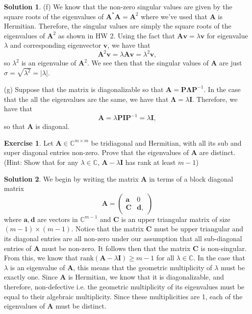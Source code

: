 \documentclass[12pt]{article}
\newcommand{\bbC}{\mathbb{C}}
\newcommand{\abs}[1]{ \left| #1 \right| }
\renewcommand{\vec}[1]{\mathbf{#1}}
\theoremstyle{definition}
\newtheorem{exer}{Exercise}
\newtheorem{sol}{Solution}
\theoremstyle{remark}
\begin{document}
\begin{sol}
(f) We know that the non-zero singular values are given by the square roots of the eigenvalues of $\vec{A}^* \vec{A} = \vec{A}^2$ where we've used that $\vec{A}$ is Hermitian. Therefore, the singular values are simply the square roots of the eigenvalues of $\vec{A}^2$ as shown in HW 2. Using the fact that $\vec{A} \vec{v} = \lambda \vec{v}$ for eigenvalue $\lambda$ and corresponding eigenvector $\vec{v}$, we have that 
\begin{equation}
    \vec{A}^2 \vec{v} = \lambda \vec{A} \vec{v} = \lambda^2 \vec{v},
\end{equation}
so $\lambda^2$ is an eigenvalue of $\vec{A}^2$. We see then that the singular values of $\vec{A}$ are just $\sigma = \sqrt{\lambda^2} = \abs{\lambda}$. 

(g) Suppose that the matrix is diagonalizable so that $\vec{A} = \vec{P} \vec{\Lambda} \vec{P}^{-1}$. In the case that the all the eigenvalues are the same, we have that $\vec{\Lambda} = \lambda \vec{I}$. Therefore, we have that 
\begin{equation*}
\vec{A} = \lambda \vec{P} \vec{I} \vec{P}^{-1} = \lambda \vec{I},
\end{equation*}
so that $\vec{A}$ is diagonal.

\end{sol}
\newpage

\begin{exer}
    Let $\vec{A}\in \bbC^{m\times m}$ be tridiagonal and Hermitian, with all its sub and super diagonal entries non-zero. Prove that the eigenvalues of $\vec{A}$ are distinct. (Hint: Show that for any $\lambda\in\bbC$,  $\vec{A} -\lambda \vec{I}$ has rank at least $m-1$)
\end{exer}

\begin{sol}
We begin by writing the matrix $\vec{A}$ in terms of a block diagonal matrix
\begin{equation*}
\vec{A} 
= 
\begin{pmatrix}
    \vec{a} & 0 \\
    \vec{C} & \vec{d},
\end{pmatrix}
\end{equation*}
where $\vec{a}, \vec{d}$ are vectors in $\bbC^{m-1}$ and  $\vec{C}$ is an upper triangular matrix of size $(m-1)\times (m-1)$. Notice that the matrix $\vec{C}$ must be upper triangular and its diagonal entries are all non-zero under our assumption that all sub-diagonal entries of $\vec{A}$ must be non-zero. It follows then that the matrix $\vec{C}$ is non-singular. From this, we know that $\text{rank}(\vec{A} - \lambda \vec{I}) \geq m-1$ for all $\lambda\in\bbC$. In the case that $\lambda$ is an eigenvalue of $\vec{A}$, this means that the geometric multiplicity of $\lambda$ must be exactly one. Since $\vec{A}$ is Hermitian, we know that it is diagonalizable, and therefore, non-defective i.e. the geometric multiplicity of its eigenvalues must be equal to their algebraic multiplicity. Since these multiplicities are 1, each of the eigenvalues of $\vec{A}$ must be distinct.
\end{sol}
\end{document}
